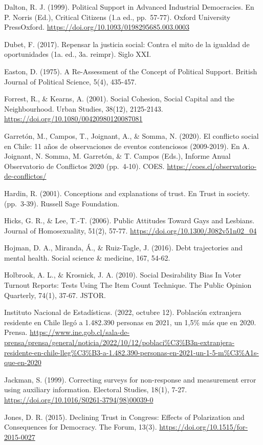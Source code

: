 \documentclass[
  12pt,
]{book}
\begin{document}
Dalton, R. J. (1999). Political Support in Advanced Industrial Democracies. En P. Norris (Ed.), Critical Citizens (1.a ed., pp.~57-77). Oxford University PressOxford. \url{https://doi.org/10.1093/0198295685.003.0003}

Dubet, F. (2017). Repensar la justicia social: Contra el mito de la igualdad de oportunidades (1a. ed., 3a. reimpr). Siglo XXI.

Easton, D. (1975). A Re-Assessment of the Concept of Political Support. British Journal of Political Science, 5(4), 435-457.

Forrest, R., \& Kearns, A. (2001). Social Cohesion, Social Capital and the Neighbourhood. Urban Studies, 38(12), 2125-2143. \url{https://doi.org/10.1080/00420980120087081}

Garretón, M., Campos, T., Joignant, A., \& Somma, N. (2020). El conflicto social en Chile: 11 años de observaciones de eventos contenciosos (2009-2019). En A. Joignant, N. Somma, M. Garretón, \& T. Campos (Eds.), Informe Anual Observatorio de Conflictos 2020 (pp.~4-10). COES. \url{https://coes.cl/observatorio-de-conflictos/}

Hardin, R. (2001). Conceptions and explanations of trust. En Trust in society. (pp.~3-39). Russell Sage Foundation.

Hicks, G. R., \& Lee, T.-T. (2006). Public Attitudes Toward Gays and Lesbians. Journal of Homosexuality, 51(2), 57-77. \url{https://doi.org/10.1300/J082v51n02_04}

Hojman, D. A., Miranda, Á., \& Ruiz-Tagle, J. (2016). Debt trajectories and mental health. Social science \& medicine, 167, 54-62.

Holbrook, A. L., \& Krosnick, J. A. (2010). Social Desirability Bias In Voter Turnout Reports: Tests Using The Item Count Technique. The Public Opinion Quarterly, 74(1), 37-67. JSTOR.

Instituto Nacional de Estadísticas. (2022, octubre 12). Población extranjera residente en Chile llegó a 1.482.390 personas en 2021, un 1,5\% más que en 2020. Prensa. \url{https://www.ine.gob.cl/sala-de-prensa/prensa/general/noticia/2022/10/12/poblaci\%C3\%B3n-extranjera-residente-en-chile-lleg\%C3\%B3-a-1.482.390-personas-en-2021-un-1-5-m\%C3\%A1s-que-en-2020}

Jackman, S. (1999). Correcting surveys for non-response and measurement error using auxiliary information. Electoral Studies, 18(1), 7-27. \url{https://doi.org/10.1016/S0261-3794(98)00039-0}

Jones, D. R. (2015). Declining Trust in Congress: Effects of Polarization and Consequences for Democracy. The Forum, 13(3). \url{https://doi.org/10.1515/for-2015-0027}
\end{document}
